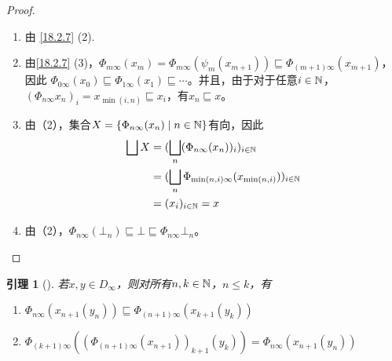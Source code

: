 \documentclass{jams-l}
\newtheorem{lemma}[theorem]{引理}
\begin{document}
\begin{proof}
\begin{enumerate}
\item 由 \ref{18.2.7} (2).
\item 由\ref{18.2.7} (3)，\(\Phi_{m\infty}(x_m)=\Phi_{m\infty}(\psi_m(x_{m+1}))\sqsubseteq\Phi_{(m+1)\infty}(x_{m+1})\)，因此
\(\Phi_{0\infty}(x_0)\sqsubseteq\Phi_{1\infty}(x_1)\sqsubseteq\cdots\)。并且，由于对于任意\(i\in\mathbb{N}\)，
\((\Phi_{n\infty}x_n)_i=x_{\min(i,n)}\sqsubseteq x_i\)，有\(x_n\sqsubseteq x\)。
\item 由（2），集合\(X=\{\Phi_{n\infty}(x_n)\mid n\in\mathbb{N}\}\)有向，因此
\begin{align*}
\bigsqcup X&=(\bigsqcup_n(\Phi_{n\infty}(x_n))_i)_{i\in\mathbb{N}}\\
&=(\bigsqcup_n\Phi_{\min(n,i)\infty}(x_{\min(n,i)}))_{i\in\mathbb{N}}\\
&=(x_i)_{i\in\mathbb{N}}=x
\end{align*}
\item 由（2），\(\Phi_{n\infty}(\bot_n)\sqsubseteq\bot\sqsubseteq\Phi_{n\infty}\bot_n\)。
\end{enumerate}
\end{proof}

\begin{lemma}[]
\label{18.2.9}
若\(x,y\in D_\infty\)，则对所有\(n,k\in\mathbb{N}\)，\(n\le k\)，有
\begin{enumerate}
\item \(\Phi_{n\infty}(x_{n+1}(y_n))\sqsubseteq \Phi_{(n+1)\infty}(x_{k+1}(y_k))\)
\item \(\Phi_{(k+1)\infty}((\Phi_{(n+1)\infty}(x_{n+1}))_{k+1}(y_k))=\Phi_{n\infty}(x_{n+1}(y_n))\)
\end{enumerate}
\end{lemma}
\end{document}
